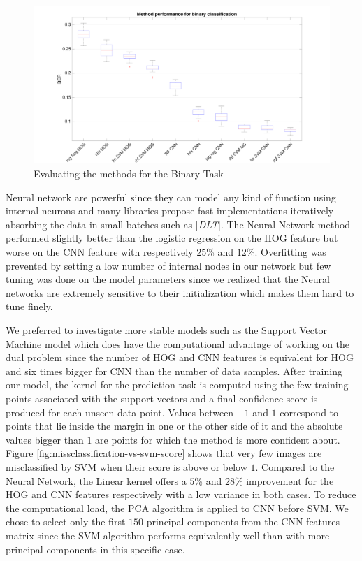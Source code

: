 \documentclass{article} %
\begin{document}
\begin{figure}[h]
  \center
  \includegraphics[width=\textwidth]{figures/binary_methods}
  \caption{Evaluating the methods for the Binary Task}
  \label{fig:methods-binary}
\end{figure}

Neural network are powerful since they can model any kind of function using internal neurons and many libraries propose fast implementations iteratively absorbing the data in small batches such as [\textit{DLT}]. The Neural Network method performed slightly better than the logistic regression on the HOG feature but worse on the CNN feature with respectively $25$\% and $12$\%. Overfitting was prevented by setting a low number of internal nodes in our network but few tuning was done on the model parameters since we realized that the Neural networks are extremely sensitive to their initialization which makes them hard to tune finely.

We preferred to investigate more stable models such as the Support Vector Machine model which does have the computational advantage of working on the dual problem since the number of HOG and CNN features is equivalent for HOG and six times bigger for CNN than the number of data samples. After training our model, the kernel for the prediction task is computed using the few training points associated with the support vectors and a final confidence score is produced for each unseen data point. Values between $-1$ and $1$ correspond to points that lie inside the margin in one or the other side of it and the absolute values bigger than $1$ are points for which the method is more confident about. Figure \ref{fig:missclassification-vs-svm-score} shows that very few images are misclassified by SVM when their score is above or below $1$.
Compared to the Neural Network, the Linear kernel offers a $5$\% and $28$\% improvement for the HOG and CNN features respectively with a low variance in both cases. To reduce the computational load, the PCA algorithm is applied to CNN before SVM. We chose to select only the first $150$ principal components from the CNN features matrix since the SVM algorithm performs equivalently well than with more principal components in this specific case.
\end{document}
